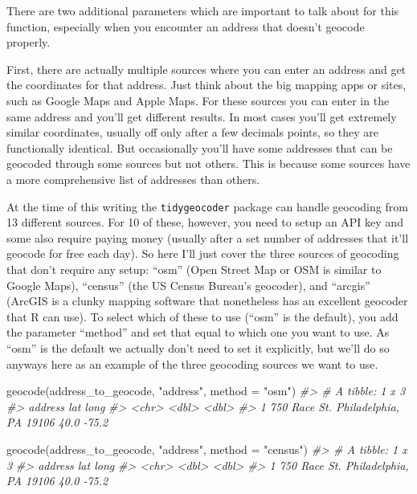 \documentclass[
]{krantz}
\makeatletter
\newenvironment{Shaded}{\begin{snugshade}}{\end{snugshade}}
\newcommand{\AttributeTok}[1]{\textcolor[rgb]{0.61,0.61,0.61}{#1}}
\newcommand{\CommentTok}[1]{\textcolor[rgb]{0.37,0.37,0.37}{\textit{#1}}}
\newcommand{\FunctionTok}[1]{\textcolor[rgb]{0,0,0}{#1}}
\newcommand{\NormalTok}[1]{#1}
\newcommand{\StringTok}[1]{\textcolor[rgb]{0.5,0.5,0.5}{#1}}
\newenvironment{kframe}{%
\medskip{}
\setlength{\fboxsep}{.8em}
 \def\at@end@of@kframe{}%
 \ifinner\ifhmode%
  \def\at@end@of@kframe{\end{minipage}}%
  \begin{minipage}{\columnwidth}%
 \fi\fi%
 \def\FrameCommand##1{\hskip\@totalleftmargin \hskip-\fboxsep
 \colorbox{shadecolor}{##1}\hskip-\fboxsep
     \hskip-\linewidth \hskip-\@totalleftmargin \hskip\columnwidth}%
 \MakeFramed {\advance\hsize-\width
   \@totalleftmargin\z@ \linewidth\hsize
   \@setminipage}}%
 {\par\unskip\endMakeFramed%
 \at@end@of@kframe}
\renewenvironment{Shaded}{\begin{kframe}}{\end{kframe}}
\makeatother
\begin{document}
There are two additional parameters which are important to talk about for this function, especially when you encounter an address that doesn't geocode properly.

First, there are actually multiple sources where you can enter an address and get the coordinates for that address. Just think about the big mapping apps or sites, such as Google Maps and Apple Maps. For these sources you can enter in the same address and you'll get different results. In most cases you'll get extremely similar coordinates, usually off only after a few decimals points, so they are functionally identical. But occasionally you'll have some addresses that can be geocoded through some sources but not others. This is because some sources have a more comprehensive list of addresses than others.

At the time of this writing the \texttt{tidygeocoder} package can handle geocoding from 13 different sources. For 10 of these, however, you need to setup an API key and some also require paying money (usually after a set number of addresses that it'll geocode for free each day). So here I'll just cover the three sources of geocoding that don't require any setup: ``osm'' (Open Street Map or OSM is similar to Google Maps), ``census'' (the US Census Bureau's geocoder), and ``arcgis'' (ArcGIS is a clunky mapping software that nonetheless has an excellent geocoder that R can use). To select which of these to use (``osm'' is the default), you add the parameter ``method'' and set that equal to which one you want to use. As ``osm'' is the default we actually don't need to set it explicitly, but we'll do so anyways here as an example of the three geocoding sources we want to use.

\begin{Shaded}
\begin{Highlighting}[]
\FunctionTok{geocode}\NormalTok{(address\_to\_geocode, }\StringTok{"address"}\NormalTok{, }\AttributeTok{method =} \StringTok{"osm"}\NormalTok{)}
\CommentTok{\#\textgreater{} \# A tibble: 1 x 3}
\CommentTok{\#\textgreater{}   address                               lat  long}
\CommentTok{\#\textgreater{}   \textless{}chr\textgreater{}                               \textless{}dbl\textgreater{} \textless{}dbl\textgreater{}}
\CommentTok{\#\textgreater{} 1 750 Race St. Philadelphia, PA 19106  40.0 {-}75.2}
\end{Highlighting}
\end{Shaded}

\begin{Shaded}
\begin{Highlighting}[]
\FunctionTok{geocode}\NormalTok{(address\_to\_geocode, }\StringTok{"address"}\NormalTok{, }\AttributeTok{method =} \StringTok{"census"}\NormalTok{)}
\CommentTok{\#\textgreater{} \# A tibble: 1 x 3}
\CommentTok{\#\textgreater{}   address                               lat  long}
\CommentTok{\#\textgreater{}   \textless{}chr\textgreater{}                               \textless{}dbl\textgreater{} \textless{}dbl\textgreater{}}
\CommentTok{\#\textgreater{} 1 750 Race St. Philadelphia, PA 19106  40.0 {-}75.2}
\end{Highlighting}
\end{Shaded}
\end{document}
